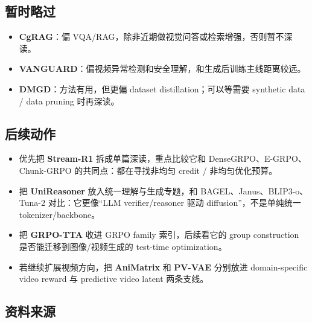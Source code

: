 \subsection{暂时略过}

\begin{itemize}[leftmargin=1.5em]
  \item \textbf{CgRAG}：偏 VQA/RAG，除非近期做视觉问答或检索增强，否则暂不深读。
  \item \textbf{VANGUARD}：偏视频异常检测和安全理解，和生成后训练主线距离较远。
  \item \textbf{DMGD}：方法有用，但更偏 dataset distillation；可以等需要 synthetic data / data pruning 时再深读。
\end{itemize}

\subsection{后续动作}

\begin{itemize}[leftmargin=1.5em]
  \item 优先把 \textbf{Stream-R1} 拆成单篇深读，重点比较它和 DenseGRPO、E-GRPO、Chunk-GRPO 的共同点：都在寻找非均匀 credit / 非均匀优化预算。
  \item 把 \textbf{UniReasoner} 放入统一理解与生成专题，和 BAGEL、Janus、BLIP3-o、Tuna-2 对比：它更像“LLM verifier/reasoner 驱动 diffusion”，不是单纯统一 tokenizer/backbone。
  \item 把 \textbf{GRPO-TTA} 收进 GRPO family 索引，后续看它的 group construction 是否能迁移到图像/视频生成的 test-time optimization。
  \item 若继续扩展视频方向，把 \textbf{AniMatrix} 和 \textbf{PV-VAE} 分别放进 domain-specific video reward 与 predictive video latent 两条支线。
\end{itemize}

\subsection{资料来源}


